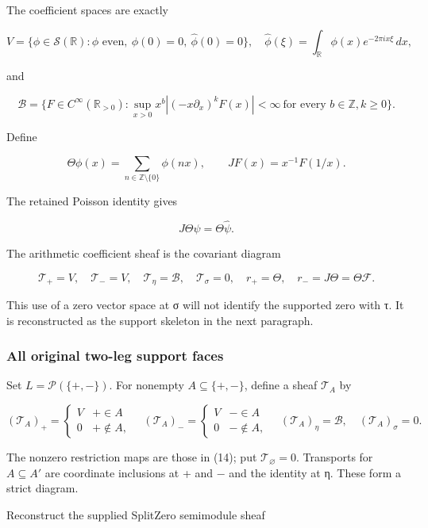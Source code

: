 \documentclass[
]{article}
\begin{document}
The coefficient spaces are exactly

\[
V=\{\phi\in\mathcal S(\mathbb R):\phi\text{ even},\ \phi(0)=0,\ \widehat\phi(0)=0\},
\quad
\widehat\phi(\xi)=\int_{\mathbb R}\phi(x)e^{-2\pi i x\xi}\,dx,
\tag{10}
\]

and

\[
\mathscr B=\{F\in C^\infty(\mathbb R_{>0}):
\sup_{x>0}x^b|(-x\partial_x)^kF(x)|<\infty
\ \text{for every }b\in\mathbb Z,k\ge0\}.
\tag{11}
\]

Define

\[
\Theta\phi(x)=\sum_{n\in\mathbb Z\setminus\{0\}}\phi(nx),
\qquad JF(x)=x^{-1}F(1/x).
\tag{12}
\]

The retained Poisson identity gives

\[
J\Theta\psi=\Theta\widehat\psi.
\tag{13}
\]

The arithmetic coefficient sheaf is the covariant diagram

\[
\mathcal T_+=V,\quad\mathcal T_-=V,\quad
\mathcal T_\eta=\mathscr B,\quad\mathcal T_\sigma=0,
\quad r_+=\Theta,\quad r_-=J\Theta=\Theta\mathcal F.
\tag{14}
\]

This use of a zero vector space at σ will not identify the supported
zero with τ. It is reconstructed as the support skeleton in the next
paragraph.

\subsubsection{All original two-leg support
faces}\label{all-original-two-leg-support-faces}

Set \(L=\mathcal P(\{+,-\})\). For nonempty \(A\subseteq\{+,-\}\),
define a sheaf \(\mathcal T_A\) by

\[
(\mathcal T_A)_+=\begin{cases}V&+\in A\\0&+\notin A,\end{cases}
\quad
(\mathcal T_A)_-=\begin{cases}V&-\in A\\0&-\notin A,\end{cases}
\quad
(\mathcal T_A)_\eta=\mathscr B,\quad
(\mathcal T_A)_\sigma=0.
\tag{15}
\]

The nonzero restriction maps are those in (14); put
\(\mathcal T_\varnothing=0\). Transports for \(A\subseteq A'\) are
coordinate inclusions at + and − and the identity at η. These form a
strict diagram.

Reconstruct the supplied SplitZero semimodule sheaf
\end{document}
